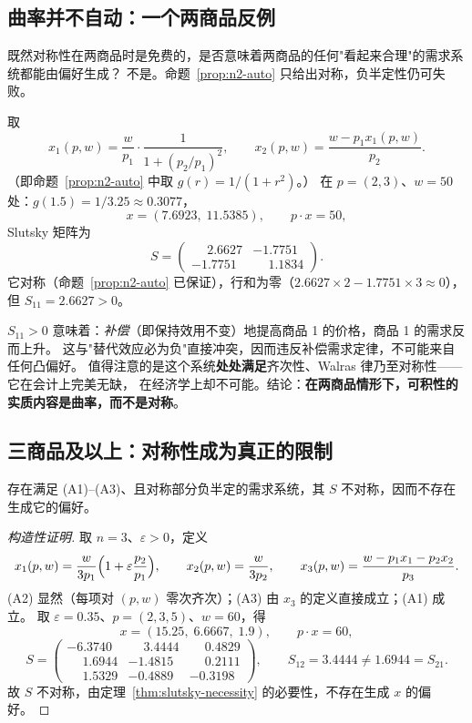 \subsection{曲率并不自动：一个两商品反例}

既然对称性在两商品时是免费的，是否意味着两商品的任何"看起来合理"的需求系统都能由偏好生成？
不是。命题~\ref{prop:n2-auto} 只给出对称，负半定性仍可失败。

\begin{example}[对称但不可积的两商品系统]\label{ex:n2-curvature}
取
\[
 x_1(p,w)=\frac{w}{p_1}\cdot\frac{1}{1+(p_2/p_1)^2},\qquad
 x_2(p,w)=\frac{w-p_1x_1(p,w)}{p_2}.
\]
（即命题~\ref{prop:n2-auto} 中取 $g(r)=1/(1+r^2)$。）
在 $p=(2,3)$、$w=50$ 处：$g(1.5)=1/3.25\approx0.3077$，
\[
 x=(7.6923,\;11.5385),\qquad p\cdot x=50,
\]
Slutsky 矩阵为
\[
 S=\begin{pmatrix}
 \phantom{-}2.6627 & -1.7751\\
 -1.7751 & \phantom{-}1.1834
 \end{pmatrix}.
\]
它对称（命题~\ref{prop:n2-auto} 已保证），行和为零（$2.6627\times2-1.7751\times3\approx0$），
但 $S_{11}=2.6627>0$。
\end{example}

\begin{remark}[这个反例说明了什么]
$S_{11}>0$ 意味着：\emph{补偿}（即保持效用不变）地提高商品 1 的价格，商品 1 的需求反而上升。
这与"替代效应必为负"直接冲突，因而违反补偿需求定律，不可能来自任何凸偏好。
值得注意的是这个系统\textbf{处处满足}齐次性、Walras 律乃至对称性——它在会计上完美无缺，
在经济学上却不可能。结论：\textbf{在两商品情形下，可积性的实质内容是曲率，而不是对称}。
\end{remark}

\subsection{三商品及以上：对称性成为真正的限制}

\begin{proposition}[$n\ge3$ 时对称性是实质约束]\label{prop:n3-substantive}
存在满足 (A1)--(A3)、且对称部分负半定的需求系统，其 $S$ 不对称，因而不存在生成它的偏好。
\end{proposition}

\begin{proof}[构造性证明]
取 $n=3$、$\varepsilon>0$，定义
\[
 x_1(p,w)=\frac{w}{3p_1}\Bigl(1+\varepsilon\frac{p_2}{p_1}\Bigr),\qquad
 x_2(p,w)=\frac{w}{3p_2},\qquad
 x_3(p,w)=\frac{w-p_1x_1-p_2x_2}{p_3}.
\]
(A2) 显然（每项对 $(p,w)$ 零次齐次）；(A3) 由 $x_3$ 的定义直接成立；(A1) 成立。
取 $\varepsilon=0.35$、$p=(2,3,5)$、$w=60$，得
\[
 x=(15.25,\;6.6667,\;1.9),\qquad p\cdot x=60,
\]
\[
 S=\begin{pmatrix}
 -6.3740 & \phantom{-}3.4444 & \phantom{-}0.4829\\
 \phantom{-}1.6944 & -1.4815 & \phantom{-}0.2111\\
 \phantom{-}1.5329 & -0.4889 & -0.3198
 \end{pmatrix},
\qquad
 S_{12}=3.4444\ne1.6944=S_{21}.
\]
故 $S$ 不对称，由定理~\ref{thm:slutsky-necessity} 的必要性，不存在生成 $x$ 的偏好。
\end{proof}

